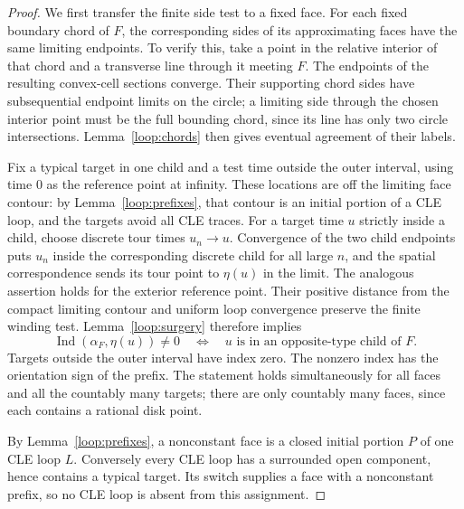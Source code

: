 \begin{proof}
We first transfer the finite side test to a fixed face.  For each fixed
boundary chord of $F$, the corresponding sides of its approximating
faces have the same limiting endpoints.  To verify this, take a point
in the relative interior of that chord and a transverse line through
it meeting $F$.  The endpoints of the resulting convex-cell sections
converge.  Their supporting chord sides have subsequential endpoint
limits on the circle; a limiting side through the chosen interior
point must be the full bounding chord, since its line has only two
circle intersections.  Lemma~\ref{loop:chords} then gives eventual
agreement of their labels.

Fix a typical target in one child and a test time outside the outer
interval, using time $0$ as the reference point at infinity.  These
locations are off the limiting face contour: by
Lemma~\ref{loop:prefixes}, that contour is an initial portion of a CLE
loop, and the targets avoid all CLE traces.  For a target time $u$
strictly inside a child, choose discrete tour times $u_n\to u$.
Convergence of the two child endpoints puts $u_n$ inside the
corresponding discrete child for all large $n$, and the spatial
correspondence sends its tour point to $\eta(u)$ in the limit.
The analogous assertion holds for the exterior reference point.
Their positive distance from the compact limiting contour and uniform
loop convergence preserve the finite winding test.
Lemma~\ref{loop:surgery} therefore implies
\begin{equation}\label{loop:side-test}
 \operatorname{Ind}(\alpha_F,\eta(u))\ne0
 \quad\Longleftrightarrow\quad
 u\text{ is in an opposite-type child of }F.
\end{equation}
Targets outside the outer interval have index zero.  The nonzero
index has the orientation sign of the prefix.  The statement holds
simultaneously for all faces and all the countably many targets;
there are only countably many faces, since each contains a rational
disk point.

By Lemma~\ref{loop:prefixes}, a nonconstant face is a closed initial
portion $P$ of one CLE loop $L$.  Conversely every CLE loop has a
surrounded open component, hence contains a typical target.  Its
switch supplies a face with a nonconstant prefix, so no CLE loop is
absent from this assignment.


\end{proof}
